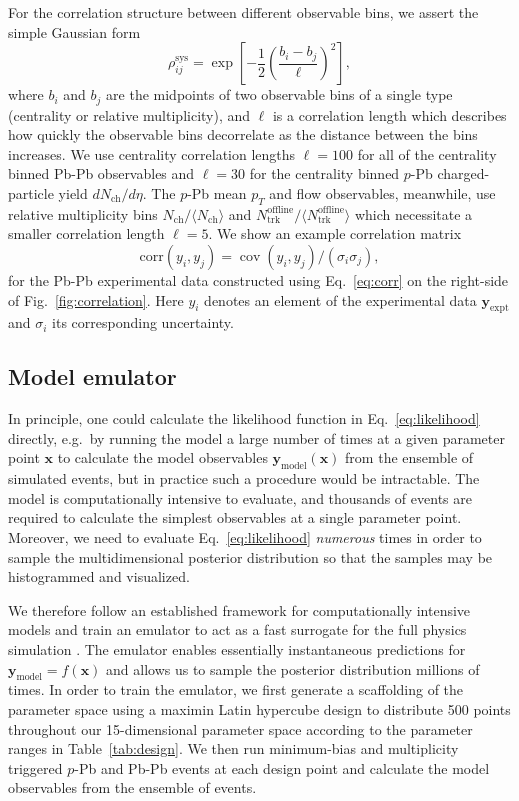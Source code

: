 \documentclass[aps,prc,reprint,amsmath,nofootinbib]{revtex4-1}
\newcommand{\nch}{N_\text{ch}}
\newcommand{\ntrk}{N_\text{trk}^\text{offline}}
\newcommand{\xv}{\mathbf x}
\newcommand{\ym}{{\mathbf y}_\text{model}}
\newcommand{\ye}{{\mathbf y}_\text{expt}}
\DeclareMathOperator{\cov}{cov}
\begin{document}
For the correlation structure between different observable bins, we assert the simple Gaussian form
\begin{equation}
  \label{eq:corr}
  \rho_{ij}^\text{sys} = \exp \left[ -\frac{1}{2} \left(\frac{b_i - b_j}{\ell} \right)^2 \right],
\end{equation}
where $b_i$ and $b_j$ are the midpoints of two observable bins of a single type (centrality or relative multiplicity), and $\ell$ is a correlation length which describes how quickly the observable bins decorrelate as the distance between the bins increases.
We use centrality correlation lengths ${\ell=100}$ for all of the centrality binned Pb-Pb observables and $\ell=30$ for the centrality binned $p$-Pb charged-particle yield $d\nch/d\eta$.
The \mbox{$p$-Pb} mean $p_T$ and flow observables, meanwhile, use relative multiplicity bins $\nch / \langle \nch \rangle$ and $\ntrk / \langle \ntrk \rangle$ which necessitate a smaller correlation length $\ell=5$.
We show an example correlation matrix
\begin{equation}
  \mathrm{corr}(y_i, y_j) = \cov(y_i, y_j)/(\sigma_i \sigma_j),
\end{equation}
for the Pb-Pb experimental data constructed using Eq.~\eqref{eq:corr} on the right-side of Fig.~\ref{fig:correlation}.
Here $y_i$ denotes an element of the experimental data $\ye$ and $\sigma_i$ its corresponding uncertainty.

\subsection{Model emulator}

In principle, one could calculate the likelihood function in Eq.~\eqref{eq:likelihood} directly, e.g.\ by running the model a large number of times at a given parameter point $\xv$ to calculate the model observables $\ym(\xv)$ from the ensemble of simulated events, but in practice such a procedure would be intractable.
The model is computationally intensive to evaluate, and thousands of events are required to calculate the simplest observables at a single parameter point.
Moreover, we need to evaluate Eq.~\eqref{eq:likelihood} \emph{numerous} times in order to sample the multidimensional posterior distribution so that the samples may be histogrammed and visualized.

We therefore follow an established framework for computationally intensive models and train an emulator to act as a fast surrogate for the full physics simulation \cite{OHagan:2006ba, Higdon:2008cmc, Higdon:2014tva}.
The emulator enables essentially instantaneous predictions for $\ym = f(\xv)$ and allows us to sample the posterior distribution millions of times.
In order to train the emulator, we first generate a scaffolding of the parameter space using a maximin Latin hypercube design \cite{Morris:1995lh} to distribute 500 points throughout our 15-dimensional parameter space according to the parameter ranges in Table~\ref{tab:design}.
We then run minimum-bias and multiplicity triggered $p$-Pb and Pb-Pb events at each design point and calculate the model observables from the ensemble of events.
\end{document}
